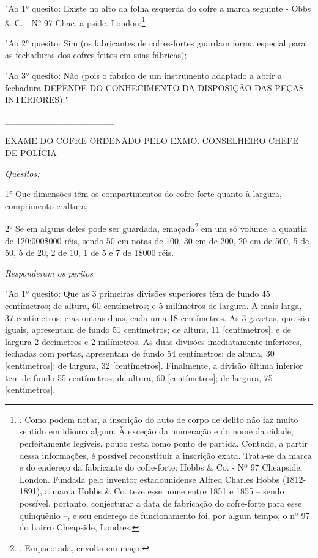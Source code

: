 "Ao 1° quesito: Existe no alto da folha esquerda do cofre a marca
seguinte - Obbs \& C. - N° 97 Chac. a pside. London;\footnote{. Como
  podem notar, a inscrição do auto de corpo de delito não faz muito
  sentido em idioma algum. À exceção da numeração e do nome da cidade,
  perfeitamente legíveis, pouco resta como ponto de partida. Contudo, a
  partir dessa informações, é possível reconstituir a inscrição exata.
  Trata-se da marca e do endereço da fabricante do cofre-forte: Hobbs \&
  Co. - Nº 97 Cheapside, London. Fundada pelo inventor estadounidense
  Alfred Charles Hobbs (1812-1891), a marca Hobbs \& Co. teve esse nome
  entre 1851 e 1855 -- sendo possível, portanto, conjecturar a data de
  fabricação do cofre-forte para esse quinquênio --, e seu endereço de
  funcionamento foi, por algum tempo, o nº 97 do bairro Cheapside,
  Londres.}

"Ao 2° quesito: Sim (os fabricantes de cofres-fortes guardam forma
especial para as fechaduras dos cofres feitos em suas fábricas);

"Ao 3° quesito: Não (pois o fabrico de um instrumento adaptado a abrir a
fechadura DEPENDE DO CONHECIMENTO DA DISPOSIÇÃO DAS PEÇAS INTERIORES)."

\_\_\_\_\_\_\_\_\_\_\_\_\_\_\_\_\_

EXAME DO COFRE ORDENADO PELO EXMO. CONSELHEIRO CHEFE DE POLÍCIA

\emph{Quesitos:}

1° Que dimensões têm os compartimentos do cofre-forte quanto à largura,
comprimento e altura;

2° Se em alguns deles pode ser guardada, emaçada\footnote{. Empacotada,
  envolta em maço.} em um só volume, a quantia de 120:000\$000 réis,
sendo 50 em notas de 100, 30 em de 200, 20 em de 500, 5 de 50, 5 de 20,
2 de 10, 1 de 5 e 7 de 1\$000 réis.

\emph{Responderam os peritos}

"Ao 1° quesito: Que as 3 primeiras divisões superiores têm de fundo 45
centímetros; de altura, 60 centímetros; e 5 milímetros de largura. A
mais larga, 37 centímetros; e as outras duas, cada uma 18 centímetros.
As 3 gavetas, que são iguais, apresentam de fundo 51 centímetros; de
altura, 11 {[}centímetros{]}; e de largura 2 decímetros e 2 milímetros.
As duas divisões imediatamente inferiores, fechadas com portas,
apresentam de fundo 54 centímetros; de altura, 30 {[}centímetros{]}; de
largura, 32 {[}centímetros{]}. Finalmente, a divisão última inferior tem
de fundo 55 centímetros; de altura, 60 {[}centímetros{]}; de largura, 75
{[}centímetros{]}.

